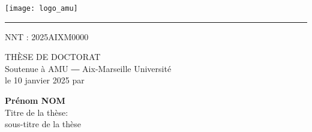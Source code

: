 \chead{}
\thispagestyle{empty}

\vspace{1em}

\begin{center}
	\begin{minipage}[c]{.5\linewidth}
		\raggedright\texttt{[image: logo\_amu]}
	\end{minipage}\hfill
	\begin{minipage}[c]{.5\linewidth}
	\end{minipage}\hfill
\end{center}


\begin{center}
	\begin{minipage}[c]{.77\linewidth}
		\textcolor{yellowamu}{\noindent\rule{\textwidth}{4pt}}
	\end{minipage}\hfill
	\begin{minipage}[c]{.23\linewidth}
		\raggedleft\textsf{NNT : 2025AIXM0000}
	\end{minipage}\hfill
\end{center}


\doublespacing
\begin{flushleft}
    \textsf{\HUGE\textcolor{blueamu}{THÈSE DE DOCTORAT}}\\
	\textsf{\Large Soutenue à AMU ― Aix-Marseille Université}\\
	\textsf{\Large le 10 janvier 2025 par}\\
\end{flushleft}
\vspace{2em}
\begin{center}
	\textsf{\textbf{\Huge Prénom NOM}}\\
    \vspace{1em}
	\textsf{\LARGE Titre de la thèse:}\\ 
	\textsf{\Large sous-titre de la thèse}\\
\end{center}
\singlespacing

